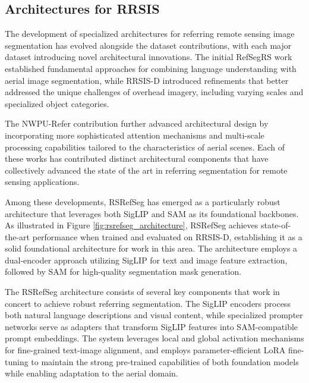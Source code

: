\subsection{Architectures for RRSIS}

The development of specialized architectures for referring remote sensing image segmentation has evolved alongside the dataset contributions, with each major dataset introducing novel architectural innovations. The initial RefSegRS work established fundamental approaches for combining language understanding with aerial image segmentation, while RRSIS-D introduced refinements that better addressed the unique challenges of overhead imagery, including varying scales and specialized object categories.

The NWPU-Refer contribution further advanced architectural design by incorporating more sophisticated attention mechanisms and multi-scale processing capabilities tailored to the characteristics of aerial scenes. Each of these works has contributed distinct architectural components that have collectively advanced the state of the art in referring segmentation for remote sensing applications.

Among these developments, RSRefSeg has emerged as a particularly robust architecture that leverages both SigLIP and SAM as its foundational backbones. As illustrated in Figure \ref{fig:rsrefseg_architecture}, RSRefSeg achieves state-of-the-art performance when trained and evaluated on RRSIS-D, establishing it as a solid foundational architecture for work in this area. The architecture employs a dual-encoder approach utilizing SigLIP for text and image feature extraction, followed by SAM for high-quality segmentation mask generation.

The RSRefSeg architecture consists of several key components that work in concert to achieve robust referring segmentation. The SigLIP encoders process both natural language descriptions and visual content, while specialized prompter networks serve as adapters that transform SigLIP features into SAM-compatible prompt embeddings. The system leverages local and global activation mechanisms for fine-grained text-image alignment, and employs parameter-efficient LoRA fine-tuning to maintain the strong pre-trained capabilities of both foundation models while enabling adaptation to the aerial domain.

